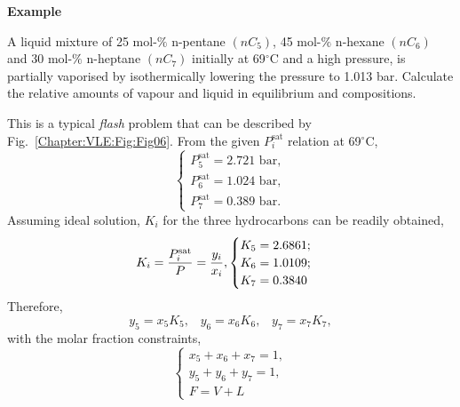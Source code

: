   \medskip
   \begin{MyExample}{\begin{center}{\bf Example}\end{center}}
     \begin{example}\label{Chapter:VLE:Example5}\citep{Sandler_Book}
       A liquid mixture of 25 mol-$\%$ n-pentane $\left(nC_{5}\right)$, 45 mol-$\%$ n-hexane $\left(nC_{6}\right)$ and 30 mol-$\%$ n-heptane $\left(nC_{7}\right)$ initially at 69$^{\circ}$C and a high pressure, is partially vaporised by isothermically lowering the pressure to  1.013 bar. Calculate the relative amounts of vapour and liquid in equilibrium and compositions.
     \end{example}

     This is a typical {\it flash} problem that can be described by Fig.~\ref{Chapter:VLE:Fig:Fig06}. From the given $P_{i}^{\text{sat}}$ relation at 69$^{\circ}$C,
   \begin{displaymath}
        \begin{cases}
            P_{5}^{\text{sat}} = 2.721 \text{ bar},\\ 
            P_{6}^{\text{sat}} = 1.024 \text{ bar},\\
            P_{7}^{\text{sat}} = 0.389 \text{ bar}.
        \end{cases}
   \end{displaymath}
Assuming ideal solution, $K_{i}$ for the three hydrocarbons can be readily obtained,
   \begin{displaymath}
        K_{i} = \displaystyle\frac{P_{i}^{\text{sat}}}{P} = \displaystyle\frac{y_{i}}{x_{i}},
          \begin{cases}
             K_{5} = 2.6861; \\
             K_{6} = 1.0109; \\
             K_{7} = 0.3840
          \end{cases}
   \end{displaymath}
   Therefore,
   \begin{displaymath}
       y_{5} = x_{5}K_{5},\;\;\;y_{6} = x_{6}K_{6},\;\;\;y_{7} = x_{7}K_{7},
   \end{displaymath}
    with the molar fraction constraints,
    \begin{displaymath}
        \begin{cases}
            x_{5}+x_{6}+x_{7} = 1,\\ 
            y_{5}+y_{6}+y_{7} = 1, \\
            F = V + L

\end{cases}
\end{displaymath}
\end{MyExample}
